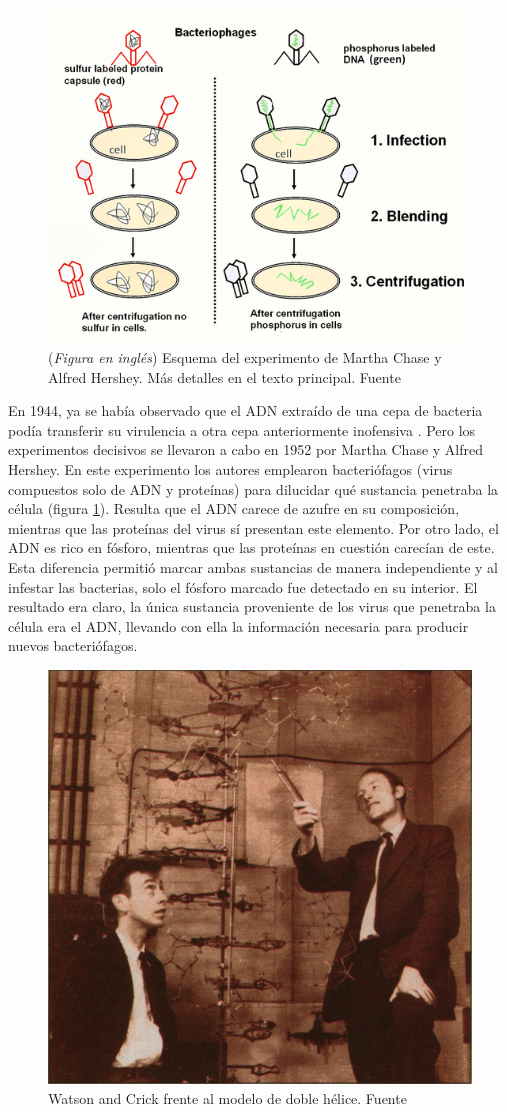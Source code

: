 \begin{figure}[bb]
   \centering
   \includegraphics[width=0.6\columnwidth]{images/Martha_Chase_and_Alfred_Hershey_Experiment.png}
   \caption{(\textit{Figura en inglés}) Esquema del experimento de Martha Chase y Alfred Hershey. Más detalles en el texto principal. Fuente \cite{wiki:Alfred_Hershey_and_Martha_Chase_Experiment}}
   \label{fig:Martha_and_Hershey_Experiment}
\end{figure}

En 1944, ya se había observado que el ADN extraído de una cepa de bacteria podía transferir su virulencia a otra cepa anteriormente inofensiva \cite{averySTUDIESCHEMICALNATURE1944}.
Pero los experimentos decisivos se llevaron a cabo en 1952 por Martha Chase y Alfred Hershey.
En este experimento \cite{hersheyIndependentFunctionsViral1952} los autores emplearon bacteriófagos (virus compuestos solo de ADN y proteínas) para dilucidar qué sustancia penetraba la célula (figura \ref{fig:Martha_and_Hershey_Experiment}).
Resulta que el ADN carece de azufre en su composición, mientras que las proteínas del virus sí presentan este elemento.
Por otro lado, el ADN es rico en fósforo, mientras que las proteínas en cuestión carecían de este.
Esta diferencia permitió marcar ambas sustancias de manera independiente y al infestar las bacterias, solo el fósforo marcado fue detectado en su interior.
El resultado era claro, la única sustancia proveniente de los virus que penetraba la célula era el ADN, llevando con ella la información necesaria para producir nuevos bacteriófagos.
 
\begin{figure}[tb]
   \centering
   \includegraphics[width=0.6\columnwidth]{images/Watson_and_Crick.png}
   \caption{Watson and Crick frente al modelo de doble hélice. Fuente \cite{hallOldSchoolTies1993}}
   \label{fig:Watson_and_Crick}
\end{figure}
 
